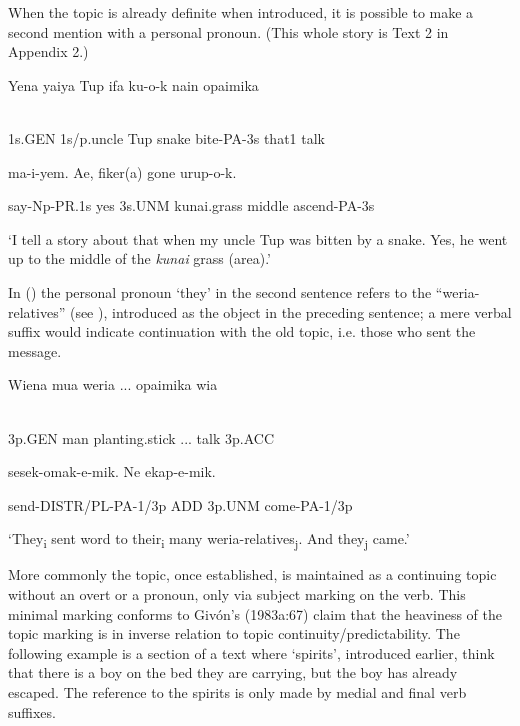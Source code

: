 When the topic is already definite when introduced, it is possible to make a second mention with a personal pronoun. (This whole story is Text 2 in Appendix 2.) 

\ea%
\label{ex:x1919}
\gll Yena  yaiya  Tup  ifa  ku-o-k  nain  opaimika  \\
      \\
\glt
\z

1s.GEN  1s/p.uncle  Tup  snake  bite-PA-3s  that1  talk  

ma-i-yem.  Ae,    fiker(a)  gone  urup-o-k.

say-Np-PR.1s  yes  3s.UNM  kunai.grass  middle  ascend-PA-3s

`I tell a story about that when my uncle Tup was bitten by a snake. Yes, he went up to the middle of the \textit{kunai} grass (area).'

In () the personal pronoun   `they' in the second sentence refers to the ``weria-relatives'' (see ), introduced as the object in the preceding sentence; a mere verbal suffix would indicate continuation with the old topic, i.e. those who sent the message. 

\ea%
\label{ex:x1868}
\gll Wiena  mua  weria  ...  opaimika  wia  \\
      \\
\glt
\z

3p.GEN  man  planting.stick  ...  talk  3p.ACC

sesek-omak-e-mik.  Ne    ekap-e-mik.

send-DISTR/PL-PA-1/3p  ADD  3p.UNM  come-PA-1/3p

`They\textsubscript{i} sent word to their\textsubscript{i} many weria-relatives\textsubscript{j}. And they\textsubscript{j} came.' 

More commonly the topic, once established, is maintained as a continuing topic without an overt  or a pronoun, only via subject marking on the verb. This minimal marking conforms to Giv\'on's (1983a:67) claim that the heaviness of the topic marking is in inverse relation to topic continuity/predictability. The following example is a section of a text where  `spirits', introduced earlier, think that there is a boy on the bed they are carrying, but the boy has already escaped. The reference to the spirits is only made by medial and final verb suffixes. 

